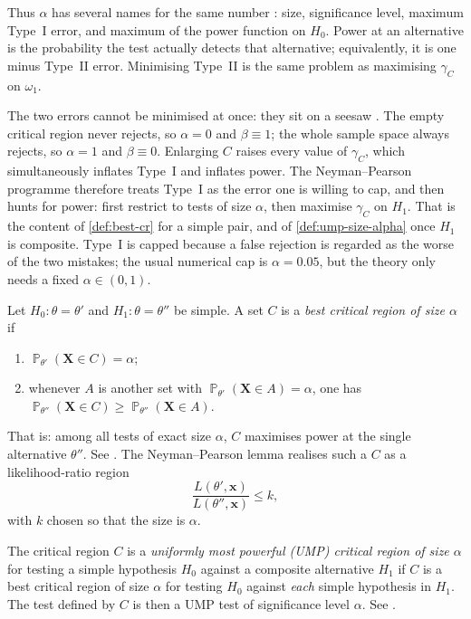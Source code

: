 \documentclass[11pt,a4paper]{article}
\DeclareMathOperator{\Pbb}{\mathbb{P}}
\begin{document}
\begin{remark}
Thus \(\alpha\) has several names for the same number \citep[after (4.5.8)]{hogg2019}: size, significance level, maximum Type~I error, and maximum of the power function on \(H_0\). Power at an alternative is the probability the test actually detects that alternative; equivalently, it is one minus Type~II error. Minimising Type~II is the same problem as maximising \(\gamma_C\) on \(\omega_1\).

The two errors cannot be minimised at once: they sit on a seesaw \citep[\S4.5]{hogg2019}. The empty critical region never rejects, so \(\alpha=0\) and \(\beta\equiv 1\); the whole sample space always rejects, so \(\alpha=1\) and \(\beta\equiv 0\). Enlarging \(C\) raises every value of \(\gamma_C\), which simultaneously inflates Type~I and inflates power. The Neyman--Pearson programme therefore treats Type~I as the error one is willing to cap, and then hunts for power: first restrict to tests of size \(\alpha\), then maximise \(\gamma_C\) on \(H_1\). That is the content of \cref{def:best-cr} for a simple pair, and of \cref{def:ump-size-alpha} once \(H_1\) is composite. Type~I is capped because a false rejection is regarded as the worse of the two mistakes; the usual numerical cap is \(\alpha=0.05\), but the theory only needs a fixed \(\alpha\in(0,1)\).
\end{remark}

\begin{definition}
\label{def:best-cr}
Let \(H_0:\theta=\theta'\) and \(H_1:\theta=\theta''\) be simple. A set \(C\) is a \emph{best critical region of size \(\alpha\)} if
\begin{enumerate}[label=\textup{(\alph*)}]
    \item
    \(\Pbb_{\theta'}(\mathbf{X}\in C)=\alpha\);
    \item
    whenever \(A\) is another set with \(\Pbb_{\theta'}(\mathbf{X}\in A)=\alpha\), one has \(\Pbb_{\theta''}(\mathbf{X}\in C)\ge\Pbb_{\theta''}(\mathbf{X}\in A)\).
\end{enumerate}
That is: among all tests of exact size \(\alpha\), \(C\) maximises power at the single alternative \(\theta''\). See \citep[Definition~8.1.1]{hogg2019}. The Neyman--Pearson lemma \citep[Theorem~8.1.1]{hogg2019} realises such a \(C\) as a likelihood-ratio region
\[
\frac{L(\theta',\mathbf{x})}{L(\theta'',\mathbf{x})}\le k,
\]
with \(k\) chosen so that the size is \(\alpha\).
\end{definition}

\begin{definition}
\label{def:ump-size-alpha}
The critical region \(C\) is a \emph{uniformly most powerful (UMP) critical region of size \(\alpha\)} for testing a simple hypothesis \(H_0\) against a composite alternative \(H_1\) if \(C\) is a best critical region of size \(\alpha\) for testing \(H_0\) against \emph{each} simple hypothesis in \(H_1\). The test defined by \(C\) is then a UMP test of significance level \(\alpha\). See \citep[Definition~8.2.1]{hogg2019}.
\end{definition}
\end{document}
